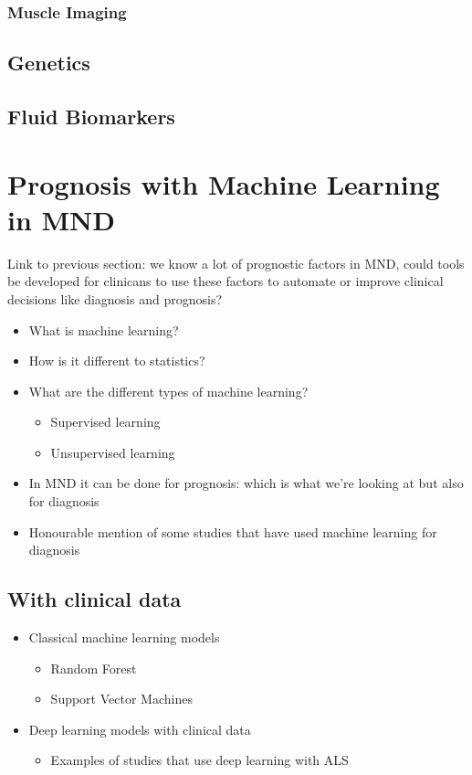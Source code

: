 \subsubsection{Muscle Imaging}


\subsection{Genetics}


\subsection{Fluid Biomarkers}



\section{Prognosis with Machine Learning in MND}

Link to previous section: we know a lot of prognostic factors in MND, could tools be developed for clinicans to use these factors to automate or improve clinical decisions like diagnosis and prognosis?


\begin{itemize}
    \item What is machine learning?
    \item How is it different to statistics?
    \item What are the different types of machine learning?
    \begin{itemize}
        \item Supervised learning
        \item Unsupervised learning
    \end{itemize}
    \item In MND it can be done for prognosis: which is what we're looking at but also for diagnosis
    \item Honourable mention of some studies that have used machine learning for diagnosis
\end{itemize}

\subsection{With clinical data}

\begin{itemize}
    \item Classical machine learning models
    \begin{itemize}
        \item Random Forest
        \item Support Vector Machines
    \end{itemize}
    \item Deep learning models with clinical data
    \begin{itemize}
        \item Examples of studies that use deep learning with ALS
    \end{itemize}
\end{itemize}

